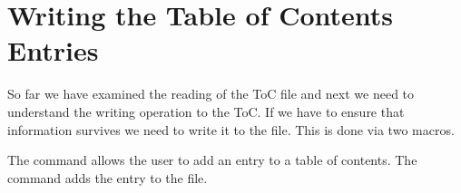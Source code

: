 \section{Writing the Table of Contents Entries}

So far we have examined the reading of the ToC file and next we need to understand the writing operation
to the ToC. If we have to ensure that information survives we need to write it to the file. This is done via two macros.


\begin{macro}{\addcontentsline}
The  command allows the user to add an entry to a table of contents. The command adds the entry
 to the  file.
\end{macro}



\begin{teX}       
 \long{}
\end{teX}

\begin{teX}
\def\addcontentsline#1#2#3{%
  \addtocontents{#1}{\protect\contentsline{#2}{#3}{\thepage}}}

\def\contentsline#1{\csname l@#1\endcsname}
\end{teX}




